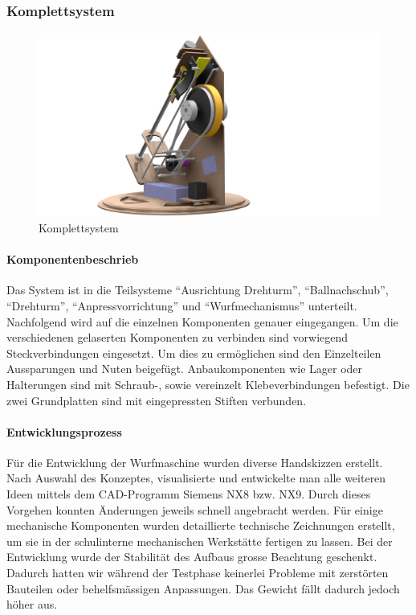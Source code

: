 \subsubsection{Komplettsystem}
\begin{figure}[h!]
	\centering
	\includegraphics[width=\linewidth]{../../fig/Komplettsystem}
	\caption{Komplettsystem}
	\label{fig:Komplettsystem}
\end{figure}
\paragraph{Komponentenbeschrieb\\}
Das System ist in die Teilsysteme "`Ausrichtung Drehturm"', "`Ballnachschub"', "`Drehturm"', "`Anpressvorrichtung"' und "`Wurfmechanismus"' unterteilt. Nachfolgend wird auf die einzelnen Komponenten genauer eingegangen. Um die verschiedenen gelaserten Komponenten zu verbinden sind vorwiegend Steckverbindungen eingesetzt. Um dies zu ermöglichen sind den Einzelteilen Aussparungen und Nuten beigefügt. Anbaukomponenten wie Lager oder Halterungen sind mit Schraub-, sowie vereinzelt Klebeverbindungen befestigt. Die zwei Grundplatten sind mit eingepressten Stiften verbunden.

\paragraph{Entwicklungsprozess\\}
Für die Entwicklung der Wurfmaschine wurden diverse Handskizzen erstellt. Nach Auswahl des Konzeptes, visualisierte und entwickelte man alle weiteren Ideen mittels dem CAD-Programm Siemens NX8 bzw. NX9. Durch dieses Vorgehen konnten Änderungen jeweils schnell angebracht werden. Für einige mechanische Komponenten wurden detaillierte technische Zeichnungen erstellt, um sie in der schulinterne mechanischen Werkstätte fertigen zu lassen. Bei der Entwicklung wurde der Stabilität des Aufbaus grosse Beachtung geschenkt. Dadurch hatten wir während der Testphase keinerlei Probleme mit zerstörten Bauteilen oder behelfsmässigen Anpassungen. Das Gewicht fällt dadurch jedoch höher aus. 